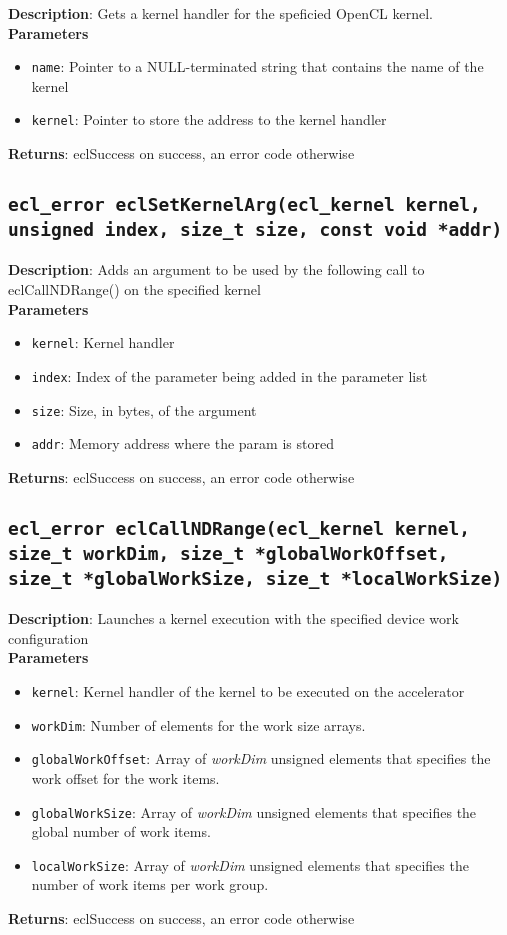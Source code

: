 \textbf{Description}: Gets a kernel handler for the speficied OpenCL kernel. \\
\textbf{Parameters}
\begin{itemize}
  \item \texttt{name}: Pointer to a NULL\hyp{}terminated string that contains the name of the kernel
  \item \texttt{kernel}: Pointer to store the address to the kernel handler
\end{itemize}
\textbf{Returns}: eclSuccess on success, an error code otherwise

\subsection{\texttt{ecl\_error eclSetKernelArg(ecl\_kernel kernel, unsigned index, size\_t size, 
const void *addr)}}

\textbf{Description}: Adds an argument to be used by the following call to eclCallNDRange() on 
the specified kernel \\
\textbf{Parameters}
\begin{itemize}
  \item \texttt{kernel}: Kernel handler
  \item \texttt{index}: Index of the parameter being added in the parameter list
  \item \texttt{size}: Size, in bytes, of the argument
  \item \texttt{addr}: Memory address where the param is stored
\end{itemize}
\textbf{Returns}: eclSuccess on success, an error code otherwise

\subsection{\texttt{ecl\_error eclCallNDRange(ecl\_kernel kernel, size\_t workDim, size\_t 
*globalWorkOffset, size\_t *globalWorkSize, size\_t *localWorkSize)}}

\textbf{Description}: Launches a kernel execution with the specified device work configuration\\
\textbf{Parameters}
\begin{itemize}
  \item \texttt{kernel}: Kernel handler of the kernel to be executed on the accelerator
  \item \texttt{workDim}: Number of elements for the work size arrays.
  \item \texttt{globalWorkOffset}: Array of \emph{workDim} unsigned elements that specifies the work 
    offset for the work items.
  \item \texttt{globalWorkSize}: Array of \emph{workDim} unsigned elements that specifies the global 
    number of work items.
  \item \texttt{localWorkSize}: Array of \emph{workDim} unsigned elements that specifies the number 
    of work items per work group.
\end{itemize}
\textbf{Returns}: eclSuccess on success, an error code otherwise

